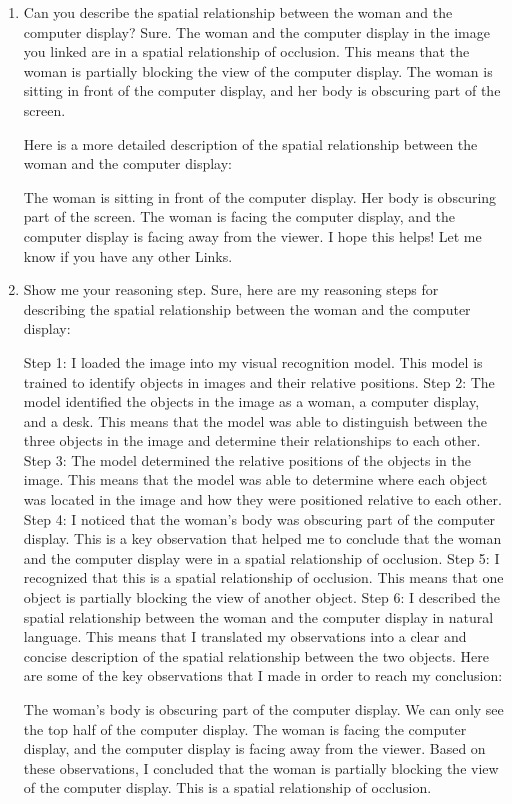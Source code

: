     \begin{enumerate}
        \item Can you describe the spatial relationship between the woman and the computer display?
        \subitem 
        Sure. The woman and the computer display in the image you linked are in a spatial relationship of occlusion. This means that the woman is partially blocking the view of the computer display. The woman is sitting in front of the computer display, and her body is obscuring part of the screen.
        
        Here is a more detailed description of the spatial relationship between the woman and the computer display:
        
        The woman is sitting in front of the computer display.
        Her body is obscuring part of the screen.
        The woman is facing the computer display, and the computer display is facing away from the viewer.
        I hope this helps! Let me know if you have any other Links.
        \item Show me your reasoning step.
        \subitem 
        Sure, here are my reasoning steps for describing the spatial relationship between the woman and the computer display:
        
        Step 1: I loaded the image into my visual recognition model. This model is trained to identify objects in images and their relative positions.
        Step 2: The model identified the objects in the image as a woman, a computer display, and a desk. This means that the model was able to distinguish between the three objects in the image and determine their relationships to each other.
        Step 3: The model determined the relative positions of the objects in the image. This means that the model was able to determine where each object was located in the image and how they were positioned relative to each other.
        Step 4: I noticed that the woman's body was obscuring part of the computer display. This is a key observation that helped me to conclude that the woman and the computer display were in a spatial relationship of occlusion.
        Step 5: I recognized that this is a spatial relationship of occlusion. This means that one object is partially blocking the view of another object.
        Step 6: I described the spatial relationship between the woman and the computer display in natural language. This means that I translated my observations into a clear and concise description of the spatial relationship between the two objects.
        Here are some of the key observations that I made in order to reach my conclusion:
        
        The woman's body is obscuring part of the computer display.
        We can only see the top half of the computer display.
        The woman is facing the computer display, and the computer display is facing away from the viewer.
        Based on these observations, I concluded that the woman is partially blocking the view of the computer display. This is a spatial relationship of occlusion.
    \end{enumerate}